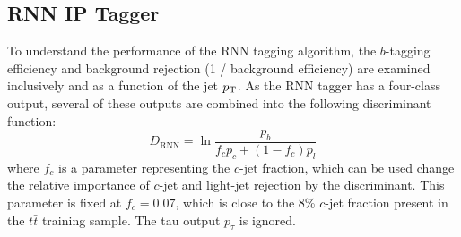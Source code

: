 \subsection{RNN IP Tagger}

To understand the performance of the RNN tagging algorithm, the $b$-tagging efficiency and background rejection (1 / background efficiency) are examined inclusively and as a function of the jet $p_{{\rm T}}$. As the RNN tagger has a four-class output, several of these outputs are combined into the following discriminant function:
\begin{equation}
D_{\mathrm{RNN}} = \ln \frac{p_{b}}{f_c p_c + (1-f_c) p_l}
\end{equation}
where $f_c$ is a parameter representing the $c$-jet fraction, which can be used change the relative importance of $c$-jet and light-jet rejection by the discriminant.  This parameter is fixed at $f_c=0.07$, which is close to the 8\% $c$-jet fraction present in the $t\bar{t}$ training sample. The tau output $p_\tau$ is ignored.

